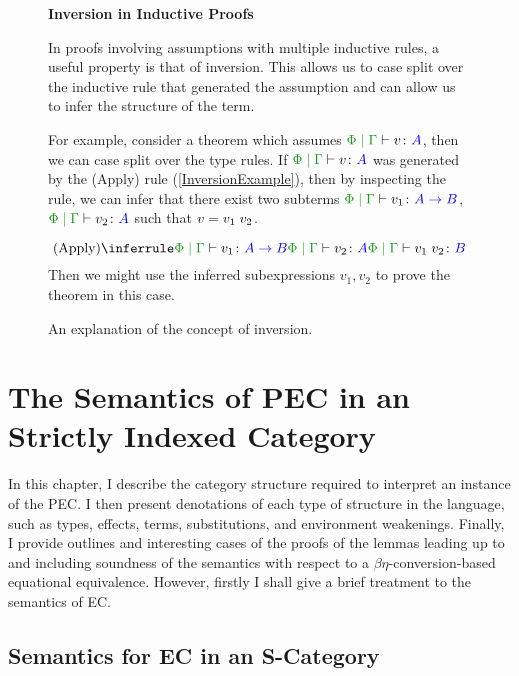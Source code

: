 \documentclass{Report}
\begin{document}
\begin{figure}
    \begin{framed}
        \textbf{Inversion in Inductive Proofs}

        In proofs involving assumptions with multiple inductive rules, a useful property is that of inversion. This allows us to case split over the inductive rule that generated the assumption and can allow us to infer the structure of the term.

        For example, consider a theorem which assumes $\gpetyperelation{v}{A}$, then we can case split over the type rules. If $\gpetyperelation{v}{A}$ was generated by the (Apply) rule (\ref{InversionExample}), then by inspecting the rule, we can infer that there exist two subterms $\gpetyperelation{v_1}{\ab}$, $\gpetyperelation{v_2}{A}$ such that $v = v_1\; v_2$. 

        \begin{equation}\label{InversionExample}
            \ntreeruleII{Apply}{\gpetyperelation{v_1}{\ab}}{\gpetyperelation{v_2}{A}}{\gpetyperelation{\apply{v_1}{v_2}}{B}}
        \end{equation}
        Then we might use the inferred subexpressions $v_1, v_2$ to prove the theorem in this case.
    \end{framed}
    \caption{An explanation of the concept of inversion.}
    \label{InversionPrinciple}
\end{figure}


\chapter{The Semantics of PEC in an Strictly Indexed Category}

In this chapter, I  describe the category structure required to interpret an instance of the PEC. I then present denotations of each type of structure in the language, such as types, effects, terms, substitutions, and environment weakenings. Finally, I provide outlines and interesting cases of the proofs of the lemmas leading up to and including soundness of the semantics with respect to a $\beta\eta$-conversion-based equational equivalence. However, firstly I shall give a brief treatment to the semantics of EC.


\section{Semantics for EC in an S-Category}\label{SCategoryIntro}
\end{document}
